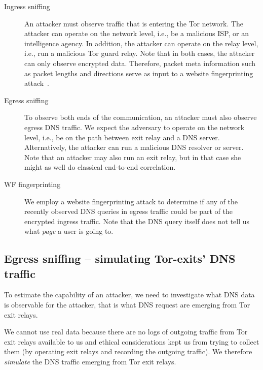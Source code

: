 \begin{description}
	\item[Ingress sniffing] An attacker must observe traffic that is entering
		the Tor network.  The attacker can operate on the network level, i.e.,
		be a malicious ISP, or an intelligence agency.  In addition, the
		attacker can operate on the relay level, i.e., run a malicious Tor guard
		relay.  Note that in both cases, the attacker can only observe encrypted
		data.  Therefore, packet meta information such as packet lengths and
		directions serve as input to a website fingerprinting
		attack~\cite{Panchenko2016a}.
	\item[Egress sniffing] To observe both ends of the communication, an
		attacker must also observe egress DNS traffic.  We expect the adversary
		to operate on the network level, i.e., be on the path between exit relay
		and a DNS server.  Alternatively, the attacker can run a malicious DNS
		resolver or server.  Note that an attacker may also run an exit relay,
		but in that case she might as well do classical end-to-end correlation.
	\item[WF fingerprinting] We employ a website fingerprinting attack to
		determine if any of the recently observed DNS queries in egress traffic
		could be part of the encrypted ingress traffic.  Note that the DNS query
		itself does not tell us what \emph{page} a user is going to.
\end{description}

\subsection{Egress sniffing -- simulating Tor-exits' DNS traffic}
To estimate the capability of an attacker, we need to investigate what
DNS data is observable for the attacker, that is what DNS request are
emerging from Tor exit relays.

We cannot use real data because there are no logs of outgoing traffic
from Tor exit relays available to us and ethical considerations kept us
from trying to collect them (\eg by operating exit relays and recording
the outgoing traffic). We therefore \emph{simulate} the DNS traffic
emerging from Tor exit relays.

